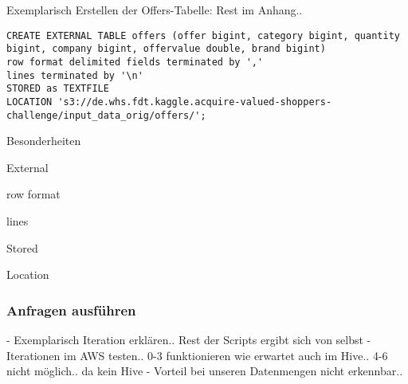 Exemplarisch Erstellen der Offers-Tabelle: Rest im Anhang..

\begin{lstlisting}[style=hive]
CREATE EXTERNAL TABLE offers (offer bigint, category bigint, quantity bigint, company bigint, offervalue double, brand bigint)
row format delimited fields terminated by ','
lines terminated by '\n'
STORED as TEXTFILE
LOCATION 's3://de.whs.fdt.kaggle.acquire-valued-shoppers- challenge/input_data_orig/offers/';
\end{lstlisting}

Besonderheiten
\begin{description}
\item External
\item row format
\item lines
\item Stored
\item Location
\end{description}

\subsubsection{Anfragen ausführen}

- Exemplarisch Iteration erklären.. Rest der Scripts ergibt sich von selbst
- Iterationen im AWS testen.. 0-3 funktionieren wie erwartet auch im Hive.. 4-6 nicht möglich.. da kein Hive
- Vorteil bei unseren Datenmengen nicht erkennbar..

